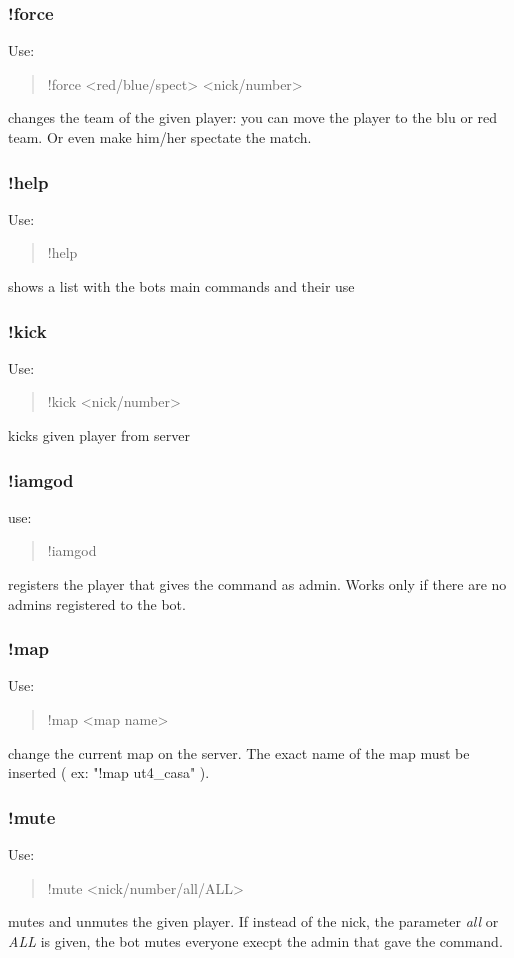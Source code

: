 \documentclass[a4paper]{article}
\begin{document}
\subsubsection{!force}
Use:
\begin{quote}
!force \textless{}red/blue/spect\textgreater{} \textless{}nick/number\textgreater{}
\end{quote}
changes the team of the given player: you can move the player to the blu or red team. Or even make him/her spectate the match.

\subsubsection{!help}
Use:
\begin{quote}
!help
\end{quote}
shows a list with the bots main commands and their use

\subsubsection{!kick}
Use:
\begin{quote}
!kick \textless{}nick/number\textgreater{}
\end{quote}
kicks given player from server

\subsubsection{!iamgod}
use:
\begin{quote}
!iamgod
\end{quote}
registers the player that gives the command as admin. Works only if there are no admins registered to the bot.

\subsubsection{!map}
Use:
\begin{quote}
!map \textless{}map name\textgreater{}
\end{quote}
change the current map on the server. The exact name of the map must be inserted ( ex: "!map ut4\_casa" ).

\subsubsection{!mute}
Use:
\begin{quote}
!mute \textless{}nick/number/all/ALL\textgreater{}
\end{quote}
mutes and unmutes the given player. If instead of the nick, the parameter \textit{all} or \textit{ALL} is given, the bot mutes everyone execpt the
admin that gave the command.
\end{document}
